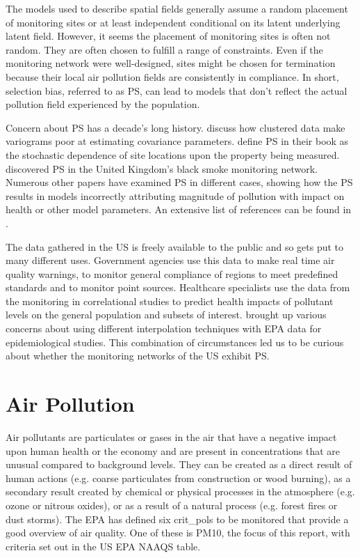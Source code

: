 \documentclass{article}
\begin{document}
The models used to describe spatial fields generally assume a random placement of monitoring sites or at least independent conditional on its latent underlying latent field.  However, it seems the placement of monitoring sites is often not random. They are often chosen to fulfill a range of constraints. Even if the monitoring network were well-designed, sites might be chosen for termination because their local air pollution fields are consistently in compliance.  In short, selection bias, referred to as \ac{PS}, can lead to models that don't reflect the actual pollution field experienced by the population. 

Concern about \ac{PS} has a decade's long history. \citet{isaaks1988spatial} discuss how clustered data make variograms poor at estimating covariance parameters. \cite{diggle:07} define \ac{PS} in their book as the stochastic dependence of site locations upon the property being measured. \cite{shaddick2012preferential} discovered  \ac{PS} in the United Kingdom's black smoke monitoring network. Numerous other papers have examined \ac{PS} in different cases, showing how the \ac{PS} results in models incorrectly attributing magnitude of pollution with impact on health or other model parameters.  An extensive list of references can be found in \citep{Zidek:2012}.  

The data gathered in the US is freely available to the public and so gets put to many different uses.  Government agencies use this data to make real time air quality warnings, to monitor general compliance of regions to meet predefined standards and to monitor point sources.  Healthcare specialists use the data from the monitoring in correlational studies to predict health impacts of pollutant levels on the general population and subsets of interest.  \cite{wong2004comparison} brought up various concerns about using different interpolation techniques with \ac{EPA} data for epidemiological studies.  This combination of circumstances led us to be curious about whether the monitoring networks of the US exhibit \ac{PS}.


\section{Air Pollution}\label{sec:introdairpollution}
Air pollutants are particulates or gases in the air that have a negative impact upon human health or the economy and are present in concentrations that are unusual compared to background levels.  They can be created as a direct result of human actions (e.g. coarse particulates from construction or wood burning), as a secondary result created by chemical or physical processes in the atmosphere (e.g. ozone or nitrous oxides), or as a result of a natural process (e.g. forest fires or dust storms).  The \ac{EPA} has defined six \glspl{crit_pol} to be monitored that provide a good overview of air quality.  One of these is \ac{PM10}, the focus of this report,  with criteria set out in the US EPA NAAQS table.
\end{document}
